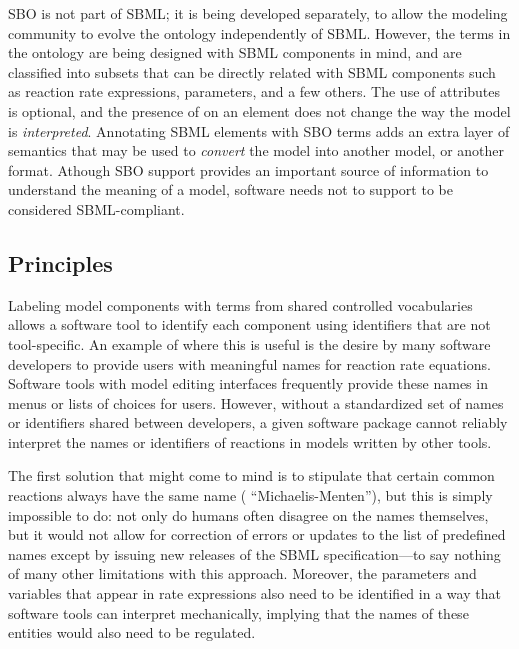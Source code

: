 SBO is not part of SBML; it is being developed separately, to
allow the modeling community to evolve the ontology independently
of SBML.  However, the terms in the ontology are being designed
with SBML components in mind, and are classified into subsets that
can be directly related with SBML components such as reaction
rate expressions, parameters, and a few others. The use of  attributes is optional, and the presence of  on an element does not change the way the model is \emph{interpreted}. Annotating SBML elements with SBO terms adds an extra layer of semantics that may be used to \emph{convert} the model into another model, or another format. Athough SBO support provides an important source of information to understand the meaning of a model, software needs not to support  to be considered SBML-compliant.


\subsection{Principles}
\label{sec:sbo-principles}

Labeling model components with terms from shared controlled
vocabularies allows a software tool to identify each component using
identifiers that are not tool-specific.  An example of where this
is useful is the desire by many software developers to provide
users with meaningful names for reaction rate equations.  Software
tools with model editing interfaces frequently provide these names
in menus or lists of choices for users.  However, without a
standardized set of names or identifiers shared between
developers, a given software package cannot reliably interpret the
names or identifiers of reactions in models written by other
tools.

The first solution that might come to mind is to stipulate that
certain common reactions always have the same name (\eg
``Michaelis-Menten''), but this is simply impossible to do: not
only do humans often disagree on the names themselves, but it
would not allow for correction of errors or updates to the list of
predefined names except by issuing new releases of the SBML
specification---to say nothing of many other limitations with this
approach.  Moreover, the parameters and variables that appear in
rate expressions also need to be identified in a way that software
tools can interpret mechanically, implying that the names of these
entities would also need to be regulated.

